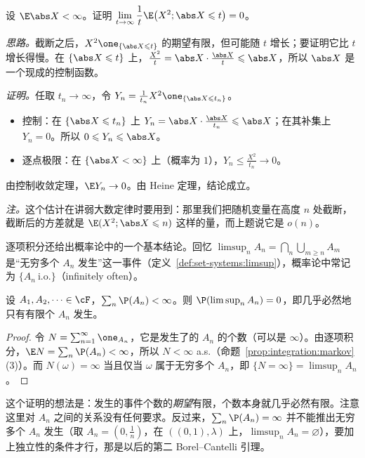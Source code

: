 \begin{workedexample}\label{we:expectation:truncated-second-moment}
设 $\E\abs X<\infty$。证明 $\displaystyle\lim_{t\to\infty}\frac1t\E\bigl(X^2;\abs X\leqslant t\bigr)=0$。
\end{workedexample}
\begin{solution}
\emph{思路。}截断之后，$X^2\one_{\{\abs X\leqslant t\}}$ 的期望有限，但可能随 $t$ 增长；要证明它比 $t$ 增长得慢。在 $\{\abs X\leqslant t\}$ 上，$\frac{X^2}t=\abs X\cdot\frac{\abs X}t\leqslant\abs X$，所以 $\abs X$ 是一个现成的控制函数。

\emph{证明。}任取 $t_n\to\infty$，令 $Y_n=\frac1{t_n}X^2\one_{\{\abs X\leqslant t_n\}}$。
\begin{itemize}
\item 控制：在 $\{\abs X\leqslant t_n\}$ 上 $Y_n=\abs X\cdot\frac{\abs X}{t_n}\leqslant\abs X$；在其补集上 $Y_n=0$。所以 $0\leqslant Y_n\leqslant\abs X$。
\item 逐点极限：在 $\{\abs X<\infty\}$ 上（概率为 $1$），$Y_n\leqslant\frac{X^2}{t_n}\to0$。
\end{itemize}
由控制收敛定理，$\E Y_n\to0$。由 Heine 定理，结论成立。

\emph{注。}这个估计在讲弱大数定律时要用到：那里我们把随机变量在高度 $n$ 处截断，截断后的方差就是 $\E(X^2;\abs X\leqslant n)$ 这样的量，而上题说它是 $o(n)$。
\end{solution}


逐项积分还给出概率论中的一个基本结论。回忆 $\limsup_nA_n=\bigcap_n\bigcup_{m\geqslant n}A_m$ 是“无穷多个 $A_n$ 发生”这一事件（定义~\ref{def:set-systems:limsup}），概率论中常记为 $\{A_n\ \text{i.o.}\}$（infinitely often）。

\begin{theorem}\label{thm:expectation:borel-cantelli}
设 $A_1,A_2,\dots\in\cF$，$\sum_n\P(A_n)<\infty$。则 $\P(\limsup_nA_n)=0$，即几乎必然地只有有限个 $A_n$ 发生。
\end{theorem}
\begin{proof}
令 $N=\sum_{n=1}^\infty\one_{A_n}$，它是发生了的 $A_n$ 的个数（可以是 $\infty$）。由逐项积分，$\E N=\sum_n\P(A_n)<\infty$，所以 $N<\infty$ a.s.（命题~\ref{prop:integration:markov}(3)）。而 $N(\omega)=\infty$ 当且仅当 $\omega$ 属于无穷多个 $A_n$，即 $\{N=\infty\}=\limsup_nA_n$。
\end{proof}

这个证明的想法是：发生的事件个数的\emph{期望}有限，个数本身就几乎必然有限。注意这里对 $A_n$ 之间的关系没有任何要求。反过来，$\sum_n\P(A_n)=\infty$ 并不能推出无穷多个 $A_n$ 发生（取 $A_n=(0,\frac1n)$，在 $((0,1),\lambda)$ 上，$\limsup_nA_n=\varnothing$），要加上独立性的条件才行，那是以后的第二 Borel--Cantelli 引理。

